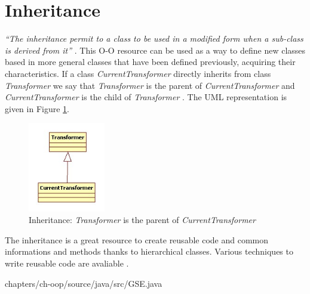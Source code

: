 \section{Inheritance}
 
\emph{
	``The inheritance permit to a class to be 
	used in a modified form when a sub-class 
	is derived from it''
} \cite{Capretz:2003}. This O-O resource 
can be used as a way to define new
classes based in more general classes 
that have been 
defined previously, acquiring their characteristics.  
If a class \emph{CurrentTransformer} directly 
inherits from class \emph{Transformer} we say that 
\emph{Transformer} is the parent 
of \emph{CurrentTransformer} and 
\emph{CurrentTransformer} is the 
child of \emph{Transformer} \cite{Snyder:1986}. 
The UML representation is given in 
Figure \ref{fig:inheritance-fig}.

\begin{figure}
  \includegraphics[width=0.3\textwidth]{chapters/ch-oop/figures/inheritance}
  \caption{
  		Inheritance: \emph{Transformer} is the parent 
		of \emph{CurrentTransformer}
		}
  \label{fig:inheritance-fig}
\end{figure}

The inheritance is a great resource to create 
reusable code and common informations and methods 
thanks to hierarchical classes. 
Various techniques to write reusable code are 
avaliable 
\cite{Johnson:1988} 
\cite{Micallef:1988}
\cite{Gossain:1990} 
\cite{Capretz:1992}.  


{chapters/ch-oop/source/java/src/GSE.java} \\


